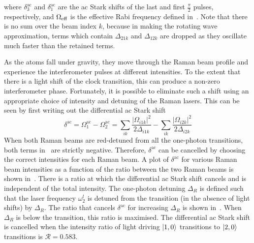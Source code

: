 where \(\delta_3^\text{ac}\) and \(\delta_1^\text{ac}\) are the ac
Stark shifts of the last and first \(\frac{\pi}{2}\) pulses,
respectively, and $\Omega_\textnormal{eff}$ is the effective Rabi
frequency defined in~. Note that there
is no sum over the beam index $k$, because in making the rotating wave
approximation, terms which contain $\Delta_{21k}$ and $\Delta_{12k}$
are dropped as they oscillate much faster than the retained terms. 
\par\noindent
As the atoms fall
under gravity, they move through the Raman beam profile and experience
the interferometer pulses at different intensities. To the extent that
there is a light shift of the clock transition, this can produce a
non-zero interferometer phase. Fortunately, it is possible
to eliminate such a shift using an appropriate choice
of intensity and detuning of the Raman lasers. This can be seen by
first writing out the differential ac Stark shift
\begin{equation}
  \delta^\text{ac} = \Omega_1^\text{ac} - \Omega_2^\text{ac} = \sum_{ik}
  \frac{\lvert\Omega_{i1k}\rvert^2}{2\Delta_{i1k}} - \sum_{ik}
  \frac{\lvert\Omega_{i2k}\rvert^2}{2\Delta_{i2k}} 
  \label{eq:diff_shift}
\end{equation}
When both Raman beams are red-detuned from
all the one-photon transitions, both terms
in~ are strictly negative. Therefore,
\(\delta^\text{ac}\) can be cancelled by choosing the correct
intensities for each Raman beam. A plot of \(\delta^{\text{ac}}\)
for various Raman beam intensities as a function of the ratio between
the two Raman beams is shown in~. There
is a ratio at which the differential ac Stark shift cancels and is
independent of the total intensity. The one-photon detuning $\Delta_R$
is defined such that the laser frequency $\omega_2^l$ is detuned from
the  transition (in the absence of light shifts) by
$\Delta_R$. The ratio that cancels
\(\delta^\text{ac}\) for increasing \(\Delta_R\) is shown
in~. When \(\Delta_R\) is
 below the  transition, this
ratio is maximised. The differential ac Stark shift is cancelled when
the intensity ratio of light driving \(\ket{1,0}\) transitions to
\(\ket{2,0}\) transitions is \(\mathcal{R} = 0.583\). 
